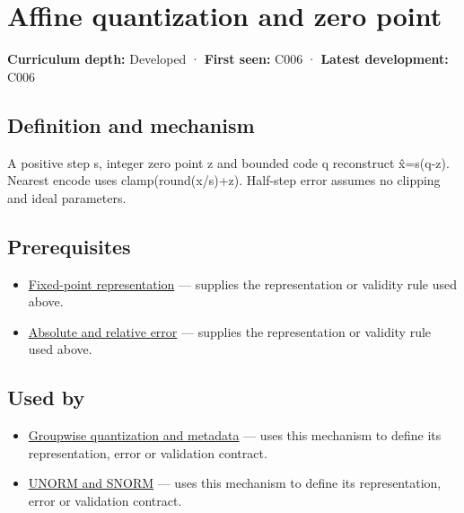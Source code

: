 \hypertarget{appendix-d5da3eaabaef}{}\label{referencestart:appendix-d5da3eaabaef}
\section{Affine quantization and zero point}\label{appendix-d5da3eaabaef-affine-quantization-and-zero-point}

\textbf{Curriculum depth:} Developed · \textbf{First seen:} C006 · \textbf{Latest development:} C006

\begin{allmightroledefinition}

\subsection{Definition and mechanism}\label{appendix-d5da3eaabaef-definition-and-mechanism}

A positive step s, integer zero point z and bounded code q reconstruct x̂=s(q-z). Nearest encode uses clamp(round(x/s)+z). Half-step error assumes no clipping and ideal parameters.

\end{allmightroledefinition}

\subsection{Prerequisites}\label{appendix-d5da3eaabaef-prerequisites}

\begin{itemize}
\tightlist
\item
  \hyperref[appendix-1d0dbe8924cc]{Fixed-point representation} --- supplies the representation or validity rule used above.
\item
  \hyperref[appendix-3ae74e89b4e6]{Absolute and relative error} --- supplies the representation or validity rule used above.
\end{itemize}

\subsection{Used by}\label{appendix-d5da3eaabaef-used-by}

\begin{itemize}
\tightlist
\item
  \hyperref[appendix-638204c40e8b]{Groupwise quantization and metadata} --- uses this mechanism to define its representation, error or validation contract.
\item
  \hyperref[appendix-b2402c453dac]{UNORM and SNORM} --- uses this mechanism to define its representation, error or validation contract.
\end{itemize}

